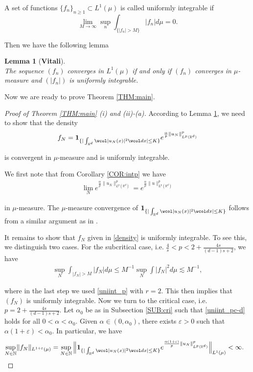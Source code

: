 \documentclass[%
11pt,  reqno]{amsart}
\newtheorem{lemma}[theorem]{Lemma}
\theoremstyle{remarkstyle}
\newcommand{\1}{\hspace{0.2mm}\text{I}\hspace{0.2mm}}
\newcommand{\noi}{\noindent}
\newcommand{\R}{\mathbb{R}}
\newcommand{\al}{\alpha}
\newcommand{\eps}{\varepsilon}
\newcommand{\wick}[1]{\wcol#1\wcol}
\newcommand{\les}{\lesssim}
\newcommand{\ind}{\mathbf 1}
\numberwithin{equation}{section}
\numberwithin{theorem}{section}
\begin{document}
	A set of functions $\{f_n\}_{n\ge 1} \subset L^1(\mu)$ is called uniformly integrable if 
	\[
	\lim_{M\to \infty} \sup_n \int_{\{|f_n|>M\}} |f_n| d\mu = 0.
	\]
	
	\noi 
	Then we have the following lemma
	\begin{lemma}[\textbf{Vitali}]\label{LEM:vitali}\mbox{}\\
		The sequence $(f_n)$ converges in $L^1(\mu)$ if and only if $(f_n)$ converges in $\mu$-measure and $(|f_n|)$ is uniformly integrable.
	\end{lemma}
	
	Now we are ready to prove Theorem \ref{THM:main}.
	
	\begin{proof}[Proof of Theorem \ref{THM:main} (i) and (ii)-(a)]
		According to Lemma \ref{LEM:vitali}, we need to show that the density 
		\begin{align}
			\label{density}
			f_N = \ind_{ \{ | \int_{\R^d} \wick{ | u_N (x)|^2 } dx | \le K\}}  e^{\frac{\al} p{\| u_N \|_{L^p (\R^d)}^p}} 
		\end{align}
		
		\noi 
		is convergent in $\mu$-measure and is uniformly integrable.
		
		We first note that from Corollary \ref{COR:intp} we have 
		\begin{align*} 
			\lim_{N} e^{\frac{\al} p{\| u_N \|_{L^p (\R^d)}^p}}  = e^{\frac{\al} p{\| u \|_{L^p (\R^d)}^p}}  
		\end{align*}
		
		\noi 
		in $\mu$-measure.
		The $\mu$-measure convergence of $\ind_{ \{ | \int_{\R^d} \wick{ | u_N (x)|^2 } dx | \le K\}}$ follows from a similar argument as in \cite[Lemma 2.7]{RSTW22}.
		
		It remains to show that $f_N$ given in \eqref{density} is uniformly integrable. To see this, we distinguish two cases.
		For the subcritical case, i.e. $\frac4s < p < 2 + \frac{4s}{(d-1)s+2}$, we have
		\begin{align}
			\label{uni_sub}
			\sup_N \int_{|f_N| > M} |f_N| d\mu \le M^{-1}   \sup_N \int |f_N|^2 d\mu \les M^{-1},
		\end{align}
		
		\noi 
		where in the last step we used \eqref{uniint_p} with $r = 2$.
		This then implies that $(f_N)$ is uniformly integrable.
		Now we turn to the critical case, i.e. $p = 2+ \frac{4s}{(d-1)s+2}$. 
		Let $\al_0$ be as in Subsection \ref{SUB:cri} such that \eqref{uniint_pc-d} holds for all $0 < \al < \al_0$. Given $\al \in (0, \al_0)$, there exists $\eps > 0$ such that $\al (1+\eps) < \al_0$. In particular, we have
		\begin{align}
			\label{uniint_pc1}
			\begin{split}
				\sup_{N \in \mathbb N} &  \|  f_N \|_{L^{1+\eps} (\mu)}  =  \sup_{N \in \mathbb N} \Big\|  \ind_{ \{ | \int_{\R^d} \wick{ | u_N (x)|^2 } dx | \le K\}}  e^{\frac{\al (1+\eps)} p{\| u_N \|_{L^p (\R^d)}^p}} \Big\|_{L^{1} (\mu)}    < \infty .
			\end{split}
		\end{align}
		

\end{proof}
\end{document}
